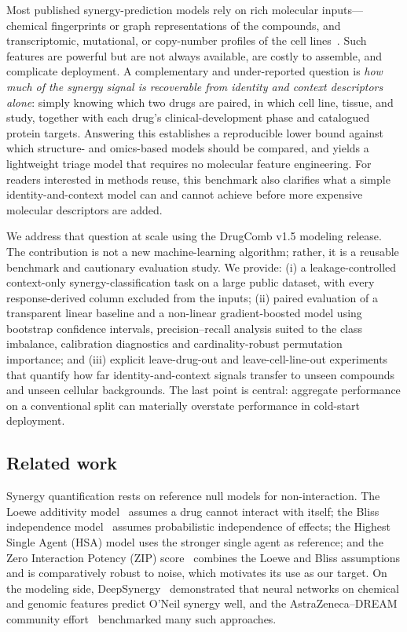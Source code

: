 \documentclass[11pt]{article}
\begin{document}
Most published synergy-prediction models rely on rich molecular inputs---chemical fingerprints or
graph representations of the compounds, and transcriptomic, mutational, or copy-number profiles of the
cell lines~\cite{preuer2018,menden2019}. Such features are powerful but are not always available, are
costly to assemble, and complicate deployment. A complementary and under-reported question is
\emph{how much of the synergy signal is recoverable from identity and context descriptors alone}:
simply knowing which two drugs are paired, in which cell line, tissue, and study, together with each
drug's clinical-development phase and catalogued protein targets. Answering this establishes a
reproducible lower bound against which structure- and omics-based models should be compared, and
yields a lightweight triage model that requires no molecular feature engineering. For readers
interested in methods reuse, this benchmark also clarifies what a simple identity-and-context
model can and cannot achieve before more expensive molecular descriptors are added.

We address that question at scale using the DrugComb v1.5 modeling release. The contribution is not a
new machine-learning algorithm; rather, it is a reusable benchmark and cautionary evaluation study. We
provide: (i) a leakage-controlled context-only synergy-classification task on a large public dataset,
with every response-derived column excluded from the inputs; (ii) paired evaluation of a transparent
linear baseline and a non-linear gradient-boosted model using bootstrap confidence intervals,
precision--recall analysis suited to the class imbalance, calibration diagnostics and
cardinality-robust permutation importance; and (iii) explicit leave-drug-out and leave-cell-line-out
experiments that quantify how far identity-and-context signals transfer to unseen compounds and
unseen cellular backgrounds. The last point is central: aggregate performance on a conventional split
can materially overstate performance in cold-start deployment.

\subsection{Related work}
Synergy quantification rests on reference null models for non-interaction. The Loewe additivity
model~\cite{loewe1953} assumes a drug cannot interact with itself; the Bliss independence
model~\cite{bliss1939} assumes probabilistic independence of effects; the Highest Single Agent (HSA)
model uses the stronger single agent as reference; and the Zero Interaction Potency (ZIP)
score~\cite{yadav2015} combines the Loewe and Bliss assumptions and is comparatively robust to noise,
which motivates its use as our target. On the modeling side, DeepSynergy~\cite{preuer2018} demonstrated
that neural networks on chemical and genomic features predict O'Neil synergy well, and the
AstraZeneca--DREAM community effort~\cite{menden2019} benchmarked many such approaches.
\end{document}
